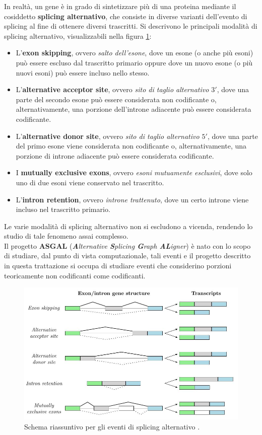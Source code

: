 \documentclass[a4paper,12pt, oneside]{book}
\begin{document}
In realtà, un gene è in grado di sintetizzare più di una proteina
mediante il cosiddetto \textbf{splicing alternativo}, che consiste in diverse
varianti dell'evento di splicing al fine di ottenere diversi trascritti. Si
descrivono le principali modalità di splicing alternativo, visualizzabili
nella figura \ref{alt}:
\begin{itemize}
  \item L'\textbf{exon skipping}, ovvero \textit{salto dell'esone}, dove un
  esone 
  (o anche più esoni) può essere escluso dal trascritto primario oppure dove un
  nuovo esone (o più nuovi esoni) può essere incluso nello stesso. 
  \item L'\textbf{alternative acceptor site}, ovvero \textit{sito di taglio
    alternativo $3'$}, dove una parte del secondo esone può essere considerata
  non codificante o, alternativamente, una porzione dell'introne adiacente può
  essere considerata codificante.
  \item L'\textbf{alternative donor site}, ovvero \textit{sito di taglio
    alternativo $5'$}, dove una parte del primo esone viene considerata non
  codificante o, alternativamente, una porzione di introne adiacente può
  essere considerata codificante.
  \item I \textbf{mutually exclusive exons}, ovvero \textit{esoni mutuamente
    esclusivi}, dove solo uno di due esoni viene conservato nel trascritto.
  \item L'\textbf{intron retention}, ovvero \textit{introne trattenuto}, dove un
  certo introne viene incluso nel trascritto primario.
\end{itemize}
Le varie modalità di splicing alternativo non si escludono a vicenda, rendendo
lo studio di tale fenomeno assai complesso.\\
Il progetto \textbf{ASGAL} \cite{denti} \cite{asgal}
(\textit{\textbf{A}lternative \textbf{S}plicing \textbf{G}raph
  \textbf{AL}igner}) è nato con lo scopo di studiare, dal punto di vista
computazionale, tali eventi e il progetto descritto in questa trattazione si
occupa di studiare eventi che considerino porzioni teoricamente non
codificanti come codificanti. 
\begin{figure}
  \centering
  \includegraphics[scale = 0.5]{img/sedenti.jpg}
  \caption{Schema riassuntivo per gli eventi di splicing alternativo
    \cite{denti}.}
  \label{alt}
\end{figure}
\end{document}
